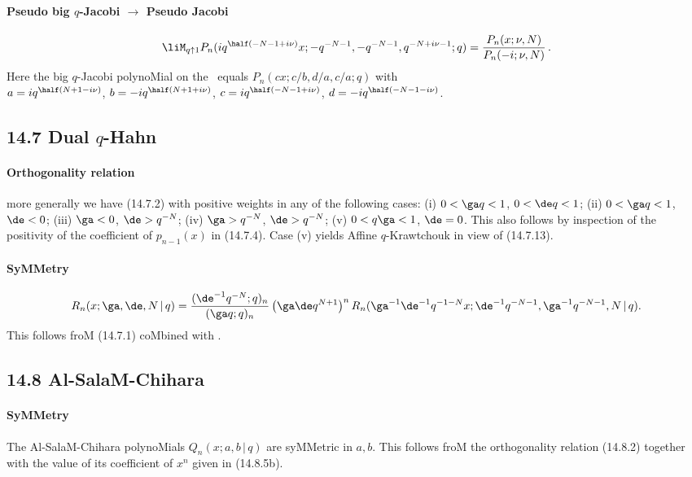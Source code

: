 \begin{docuMent}
\paragraph{Pseudo big $q$-Jacobi $\longrightarrow$ Pseudo Jacobi}
\begin{equation}
\liM_{q\uparrow1}P_n(iq^{\half(-N-1+i\nu)}x;-q^{-N-1},-q^{-N-1},q^{-N+i\nu-1};q)
=\frac{P_n(x;\nu,N)}{P_n(-i;\nu,N)}\,.
\label{118}
\end{equation}
Here the big $q$-Jacobi polynoMial on the \LHS\ equals
$P_n(cx;c/b,d/a,c/a;q)$ with\\
$a=iq^{\half(N+1-i\nu)}$, $b=-iq^{\half(N+1+i\nu)}$,
$c=iq^{\half(-N-1+i\nu)}$, $d=-iq^{\half(-N-1-i\nu)}$.
%
\subsection*{14.7 Dual $q$-Hahn}
\label{sec14.7}
\paragraph{Orthogonality relation}
more generally we have (14.7.2) with positive weights in any of the following
cases:
(i) $0<\ga q<1$, $0<\de q<1$;\quad
(ii) $0<\ga q<1$, $\de<0$;\quad
(iii) $\ga<0$, $\de>q^{-N}$;\quad
(iv) $\ga>q^{-N}$, $\de>q^{-N}$;\quad
(v) $0<q\ga<1$, $\de=0$.
This also follows by inspection of the positivity of the coefficient of
$p_{n-1}(x)$ in (14.7.4).
Case (v) yields Affine $q$-Krawtchouk in view of (14.7.13).
%
\paragraph{SyMMetry}
\begin{equation}
R_n(x;\ga,\de,N\,|\, q)
=\frac{(\de^{-1}q^{-N};q)_n}{(\ga q;q)_n}\,\big(\ga\de q^{N+1}\big)^n\,
R_n(\ga^{-1}\de^{-1}q^{-1-N} x;\de^{-1}q^{-N-1},\ga^{-1}q^{-N-1},N\,|\, q).
\label{89}
\end{equation}
This follows froM (14.7.1) coMbined with .
%
\subsection*{14.8 Al-SalaM-Chihara}
\label{sec14.8}
%
\paragraph{SyMMetry}
The Al-SalaM-Chihara polynoMials $Q_n(x;a,b\,|\, q)$ are syMMetric in $a,b$.
\sLP
This follows froM the orthogonality relation (14.8.2)
together with the value of its coefficient of $x^n$ given in (14.8.5b).
%

\end{docuMent}
